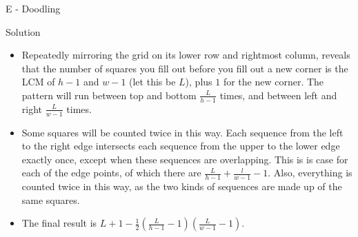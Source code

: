 \renewcommand{\insertshortauthor}{Pehr S\"oderman}
\begin{frame}{E - Doodling}

\begin{block}{Solution}
  \begin{itemize}
    \item Repeatedly mirroring the grid on its lower row and rightmost column, reveals that the number of squares you fill out before you fill out a new corner is the LCM of $h-1$ and $w-1$ (let this be $L$), plus $1$ for the new corner. The pattern will run between top and bottom $\frac{L}{h-1}$ times, and between left and right $\frac{L}{w-1}$ times.
    \item Some squares will be counted twice in this way. Each sequence from the left to the right edge intersects each sequence from the upper to the lower edge exactly once, except when these sequences are overlapping. This is is case for each of the edge points, of which there are $\frac{L}{h-1}+\frac{l}{w-1}-1$. Also, everything is counted twice in this way, as the two kinds of sequences are made up of the same squares.
    \item The final result is $L + 1 - \frac{1}{2}\left(\frac{L}{h-1} - 1\right) \left(\frac{L}{w-1} - 1\right)$.
  \end{itemize}
\end{block}

\end{frame}
